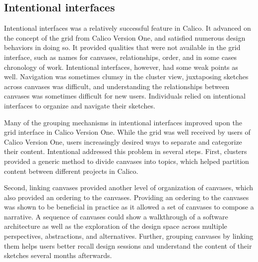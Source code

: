 \documentclass[12pt,fleqn]{ucithesis}
\begin{document}
%

\subsection{Intentional interfaces}

Intentional interfaces was a relatively successful feature in Calico. It advanced on the concept of the grid from Calico Version One, and satisfied numerous design behaviors in doing so. It provided qualities that were not available in the grid interface, such as names for canvases, relationships, order, and in some cases chronology of work. Intentional interfaces, however, had some weak points as well. Navigation was sometimes clumsy in the cluster view, juxtaposing sketches across canvases was difficult, and understanding the relationships between canvases was sometimes difficult for new users. Individuals relied on intentional interfaces to organize and navigate their sketches.

Many of the grouping mechanisms in intentional interfaces improved upon the grid interface in Calico Version One. While the grid was well received by users of Calico Version One, users increasingly desired ways to separate and categorize their content. Intentional addressed this problem in several steps. First, clusters provided a generic method to divide canvases into topics, which helped partition content between different projects in Calico.

Second, linking canvases provided another level of organization of canvases, which also provided an ordering to the canvases. Providing an ordering to the canvases was shown to be beneficial in practice as it allowed a set of canvases to compose a narrative. A sequence of canvases could show a walkthrough of a software architecture as well as the exploration of the design space across multiple perspectives, abstractions, and alternatives. Further, grouping canvases by linking them helps users better recall design sessions and understand the content of their sketches several months afterwards.
\end{document}
